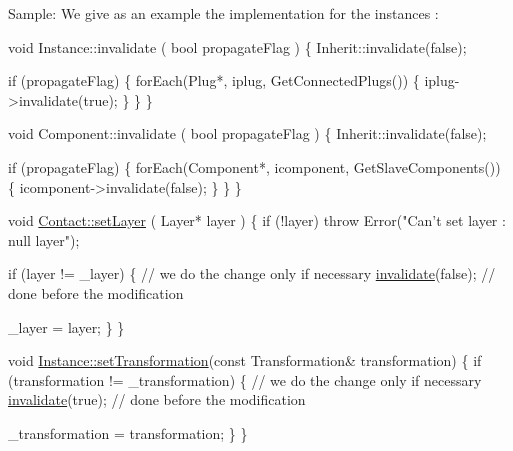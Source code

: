 \begin{DoxyParagraph}{Sample\+: We give as an example the implementation for the instances \+:}

\begin{DoxyCode}
\textcolor{keywordtype}{void} Instance::invalidate ( \textcolor{keywordtype}{bool} propagateFlag )
\{
  Inherit::invalidate(\textcolor{keyword}{false});
 
  \textcolor{keywordflow}{if} (propagateFlag) \{
    forEach(Plug*, iplug, GetConnectedPlugs()) \{
      iplug->invalidate(\textcolor{keyword}{true});
    \}
  \}
\}
\end{DoxyCode}
 
\begin{DoxyCode}
\textcolor{keywordtype}{void} Component::invalidate ( \textcolor{keywordtype}{bool} propagateFlag )
\{
  Inherit::invalidate(\textcolor{keyword}{false});
 
  \textcolor{keywordflow}{if} (propagateFlag) \{
    forEach(Component*, icomponent, GetSlaveComponents()) \{
      icomponent->invalidate(\textcolor{keyword}{false});
    \}
  \}
\}
\end{DoxyCode}
 
\begin{DoxyCode}
\textcolor{keywordtype}{void} \mbox{\hyperlink{classHurricane_1_1Contact_a147644849f33bc4d58b6b997543c8306}{Contact::setLayer}} ( Layer* layer )
\{
  \textcolor{keywordflow}{if} (!layer) \textcolor{keywordflow}{throw} Error(\textcolor{stringliteral}{"Can't set layer : null layer"});
 
  \textcolor{keywordflow}{if} (layer != \_layer) \{
    \textcolor{comment}{// we do the change only if necessary}
    \mbox{\hyperlink{classHurricane_1_1Go_a5ee451e118fe8cace16989c0f3a6d855}{invalidate}}(\textcolor{keyword}{false}); \textcolor{comment}{// done before the modification}
 
    \_layer = layer;
  \}
\}
\end{DoxyCode}
 
\begin{DoxyCode}
\textcolor{keywordtype}{void} \mbox{\hyperlink{classHurricane_1_1Instance_a8890d2e1b2ba2542997454297e63512f}{Instance::setTransformation}}(\textcolor{keyword}{const} Transformation& transformation)
\{
  \textcolor{keywordflow}{if} (transformation != \_transformation) \{
    \textcolor{comment}{// we do the change only if necessary}
    \mbox{\hyperlink{classHurricane_1_1Go_a5ee451e118fe8cace16989c0f3a6d855}{invalidate}}(\textcolor{keyword}{true}); \textcolor{comment}{// done before the modification}

    \_transformation = transformation;
  \}
\}
\end{DoxyCode}
 
\end{DoxyParagraph}
\mbox{\label{classHurricane_1_1Go_a54c4351dbbf4045e1aa89f06bb893402}} 

